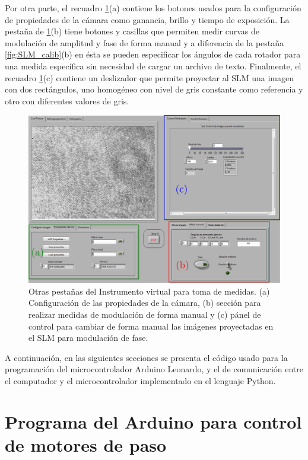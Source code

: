 Por otra parte, el recuadro \ref{fig:SLM_calib2}(a) contiene los
botones usados para la configuración de propiedades de la cámara como
ganancia, brillo y tiempo de exposición. La pestaña de
\ref{fig:SLM_calib2}(b) tiene botones y casillas que permiten medir
curvas de modulación de amplitud y fase de forma manual y a diferencia
de la pestaña \ref{fig:SLM_calib}(b) en ésta se pueden especificar los
ángulos de cada rotador para una medida específica sin necesidad de
cargar un archivo de texto. Finalmente, el recuadro
\ref{fig:SLM_calib2}(c) contiene un deslizador que permite proyectar
al SLM una imagen con dos rectángulos, uno homogéneo con nivel de gris constante como
referencia y otro con diferentes valores de gris.  
\begin{figure}[h!]
\centering
\includegraphics[scale = .4]{SLM_calib2.pdf} 
\caption[Interfaz del programa para toma de medidas 1.]{Otras pestañas
  del Instrumento virtual para toma de medidas. (a) Configuración de
  las propiedades de la cámara, (b) sección para realizar medidas de
  modulación de forma manual y (c) pánel de control para cambiar de
  forma manual las imágenes proyectadas en el SLM para modulación de fase.}
\label{fig:SLM_calib2}
\end{figure}

A continuación, en las siguientes secciones se presenta el código
usado para la programación del microcontrolador Arduino Leonardo, y el
de comunicación entre el computador y el microcontrolador implementado
en el lenguaje Python.
\pagebreak
\section{Programa del Arduino para control de motores de paso}

